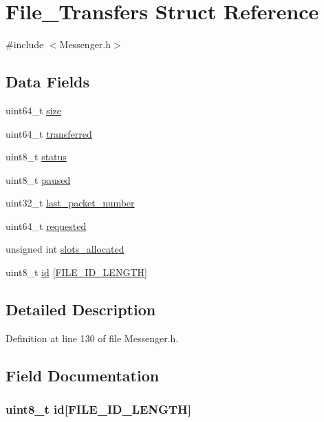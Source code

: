 \hypertarget{struct_file___transfers}{\section{File\+\_\+\+Transfers Struct Reference}
\label{struct_file___transfers}
}


{\ttfamily \#include $<$Messenger.\+h$>$}

\subsection*{Data Fields}
\begin{DoxyCompactItemize}
\item 
uint64\+\_\+t \hyperlink{struct_file___transfers_af931a8871310b4dad23f0f0b0f623560}{size}
\item 
uint64\+\_\+t \hyperlink{struct_file___transfers_ae0a9ddd27f7c6669cb964f6245b2550d}{transferred}
\item 
uint8\+\_\+t \hyperlink{struct_file___transfers_ade818037fd6c985038ff29656089758d}{status}
\item 
uint8\+\_\+t \hyperlink{struct_file___transfers_a84bd3ab7c2cbad7fb0b6233504515973}{paused}
\item 
uint32\+\_\+t \hyperlink{struct_file___transfers_a14f807289cc5523a0081c7f87aed647e}{last\+\_\+packet\+\_\+number}
\item 
uint64\+\_\+t \hyperlink{struct_file___transfers_a23cc26eca74ddec84f975c0be5496457}{requested}
\item 
unsigned int \hyperlink{struct_file___transfers_ae5c1661a0e1ed999ed054d837989556b}{slots\+\_\+allocated}
\item 
uint8\+\_\+t \hyperlink{struct_file___transfers_aa32dbb3439461c6ccc1a52ff15bcb22e}{id} \mbox{[}\hyperlink{_messenger_8h_a2f1a1efe7944eb3e268659d28b5db7d3}{F\+I\+L\+E\+\_\+\+I\+D\+\_\+\+L\+E\+N\+G\+T\+H}\mbox{]}
\end{DoxyCompactItemize}


\subsection{Detailed Description}


Definition at line 130 of file Messenger.\+h.



\subsection{Field Documentation}
\hypertarget{struct_file___transfers_aa32dbb3439461c6ccc1a52ff15bcb22e}{
\subsubsection[{id}]{\setlength{\rightskip}{0pt plus 5cm}uint8\+\_\+t id\mbox{[}{\bf F\+I\+L\+E\+\_\+\+I\+D\+\_\+\+L\+E\+N\+G\+T\+H}\mbox{]}}}\label{struct_file___transfers_aa32dbb3439461c6ccc1a52ff15bcb22e}


